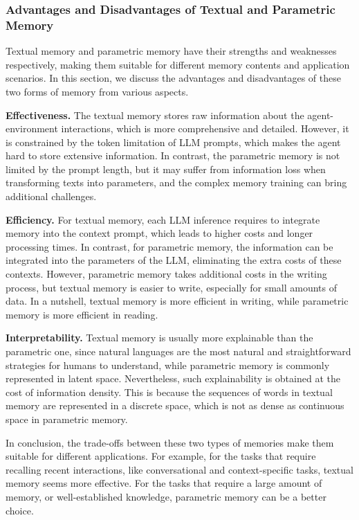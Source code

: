 \documentclass{article}
\theoremstyle{definition}
\theoremstyle{theorem}
\theoremstyle{proof}
\theoremstyle{remark}
\begin{document}
	\subsubsection{Advantages and Disadvantages of Textual and Parametric Memory}
	Textual memory and parametric memory have their strengths and weaknesses respectively, making them suitable for different memory contents and application scenarios. In this section, we discuss the advantages and disadvantages of these two forms of memory from various aspects.
	
	\textbf{Effectiveness.}
	The textual memory stores raw information about the agent-environment interactions, which is more comprehensive and detailed. However, it is constrained by the token limitation of LLM prompts, which makes the agent hard to store extensive information. 
	In contrast, the parametric memory is not limited by the prompt length, but it may suffer from information loss when transforming texts into parameters, and the complex memory training can bring additional challenges.
	
	\textbf{Efficiency.}
	For textual memory, each LLM inference requires to integrate memory into the context prompt, which leads to higher costs and longer processing times. In contrast, for parametric memory, the information can be integrated into the parameters of the LLM, eliminating the extra costs of these contexts. However, parametric memory takes additional costs in the writing process, but textual memory is easier to write, especially for small amounts of data. 
	In a nutshell, textual memory is more efficient in writing, while parametric memory is more efficient in reading.
	
	\textbf{Interpretability.}
	Textual memory is usually more explainable than the parametric one, since natural languages are the most natural and straightforward strategies for humans to understand, while parametric memory is commonly represented in latent space. 
	Nevertheless, such explainability is obtained at the cost of information density. This is because the sequences of words in textual memory are represented in a discrete space, which is not as dense as continuous space in parametric memory.
	
	In conclusion, the trade-offs between these two types of memories make them suitable for different applications. 
	For example, for the tasks that require recalling recent interactions, like conversational and context-specific tasks, textual memory seems more effective. For the tasks that require a large amount of memory, or well-established knowledge, parametric memory can be a better choice.
	
\end{document}
